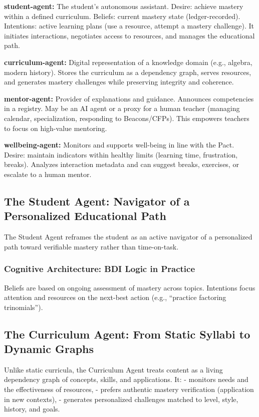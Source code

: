 \documentclass[12pt,a4paper]{article}
\begin{document}
\textbf{\gls{student-agent}:} The student's autonomous assistant. Desire: achieve mastery within a defined curriculum. Beliefs: current mastery state (ledger-recorded). Intentions: active learning plans (use a resource, attempt a mastery challenge). It initiates interactions, negotiates access to resources, and manages the educational path.

\textbf{\gls{curriculum-agent}:} Digital representation of a knowledge domain (e.g., algebra, modern history). Stores the curriculum as a dependency graph, serves resources, and generates mastery challenges while preserving integrity and coherence.

\textbf{\gls{mentor-agent}:} Provider of explanations and guidance. Announces competencies in a registry. May be an AI agent or a proxy for a human teacher (managing calendar, specialization, responding to Beacons/CFPs). This empowers teachers to focus on high-value mentoring.

\textbf{\gls{wellbeing-agent}:} Monitors and supports well-being in line with the Pact. Desire: maintain indicators within healthy limits (learning time, frustration, breaks). Analyzes interaction metadata and can suggest breaks, exercises, or escalate to a human mentor.

\subsection{The Student Agent: Navigator of a Personalized Educational Path}
The Student Agent reframes the student as an active navigator of a personalized path toward verifiable mastery rather than time-on-task.

\subsubsection{Cognitive Architecture: BDI Logic in Practice}
Beliefs are based on ongoing assessment of mastery across topics. Intentions focus attention and resources on the next-best action (e.g., \enquote{practice factoring trinomials}).

\subsection{The Curriculum Agent: From Static Syllabi to Dynamic Graphs}
Unlike static curricula, the Curriculum Agent treats content as a living dependency graph of concepts, skills, and applications. It:
- monitors needs and the effectiveness of resources,
- prefers authentic mastery verification (application in new contexts),
- generates personalized challenges matched to level, style, history, and goals.
\end{document}
